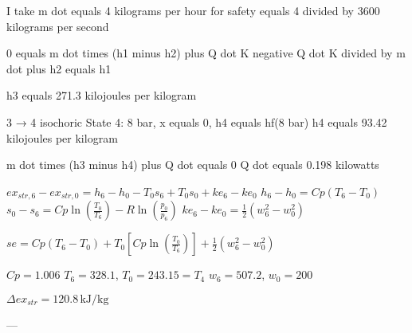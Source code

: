 I take m dot equals 4 kilograms per hour for safety equals 4 divided by 3600 kilograms per second  

0 equals m dot times (h1 minus h2) plus Q dot K  
negative Q dot K divided by m dot plus h2 equals h1  

h3 equals 271.3 kilojoules per kilogram  

3 → 4 isochoric  
State 4: 8 bar, x equals 0, h4 equals hf(8 bar)  
h4 equals 93.42 kilojoules per kilogram  

m dot times (h3 minus h4) plus Q dot equals 0  
Q dot equals 0.198 kilowatts

\( ex_{str,6} - ex_{str,0} = h_6 - h_0 - T_0 s_6 + T_0 s_0 + ke_6 - ke_0 \)  
\( h_6 - h_0 = Cp (T_6 - T_0) \)  
\( s_0 - s_6 = Cp \ln \left( \frac{T_0}{T_6} \right) - R \ln \left( \frac{p_0}{p_6} \right) \)  
\( ke_6 - ke_0 = \frac{1}{2} (w_6^2 - w_0^2) \)  

\( se = Cp (T_6 - T_0) + T_0 \left[ Cp \ln \left( \frac{T_0}{T_6} \right) \right] + \frac{1}{2} (w_6^2 - w_0^2) \)  

\( Cp = 1.006 \)  
\( T_6 = 328.1 \), \( T_0 = 243.15 = T_4 \)  
\( w_6 = 507.2 \), \( w_0 = 200 \)  

\( \Delta ex_{str} = 120.8 \, \text{kJ/kg} \)  

---